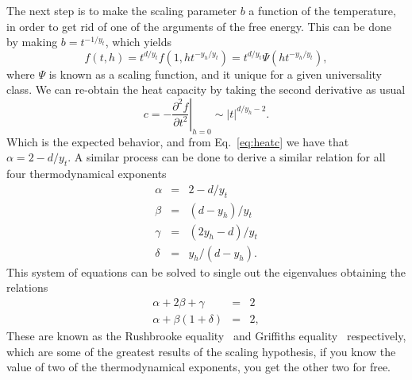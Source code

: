 The next step is to make the scaling parameter $b$ a function of the
temperature, in order to get rid of one of the arguments of the free energy.
This can be done by making $b=t^{-1/y_t}$, which yields
\begin{equation}
    f\left(t,h\right)=
    t^{d/y_{t}}f\left(1,ht^{-y_{h}/y_{t}}\right)=
    t^{d/y_{t}}\Psi\left(ht^{-y_{h}/y_{t}}\right),
\end{equation}
where $\Psi$ is known as a scaling function, and it unique for a given
universality class. We can re-obtain the heat capacity by taking
the second derivative as usual
\begin{equation}
    c=-\left.\frac{\partial^2 f}{\partial t^2}\right|_{h=0}
    \sim \left|t\right|^{d/y_h-2}.
\end{equation}
Which is the expected behavior, and from Eq.~\ref{eq:heatc} we have that
$\alpha=2-d/y_t$. A similar process can be done to derive a similar relation
for all four thermodynamical exponents
\begin{eqnarray}
    \label{eq:scal1}
    \alpha & = & 2-d/y_{t}\\
    \beta  & = & \left(d-y_{h}\right)/y_{t}\\
    \gamma & = & \left(2y_{h}-d\right)/y_{t}\\
    \label{eq:scal2}
    \delta & = & y_{h}/\left(d-y_{h}\right).
\end{eqnarray}
This system of equations can be solved to single out the eigenvalues obtaining
the relations
\begin{eqnarray}
    \alpha+2\beta+\gamma              & = & 2\\
    \alpha+\beta\left(1+\delta\right) & = & 2,
\end{eqnarray}
These are known as the Rushbrooke equality~\cite{Rushbrooke1963} and Griffiths
equality~\cite{Griffiths1967} respectively,  which are some of the greatest
results of the scaling hypothesis, if you know the value of two of the
thermodynamical exponents, you get the other two for free.

